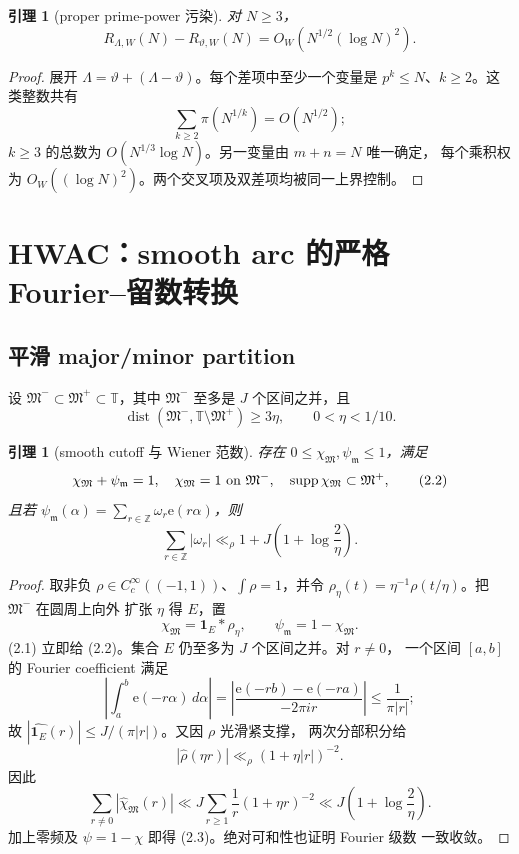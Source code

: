 \documentclass[11pt,a4paper]{ctexart}
\newtheorem{lemma}[theorem]{引理}
\theoremstyle{definition}
\newcommand{\T}{\mathbb T}
\newcommand{\e}{\mathrm e}
\newcommand{\1}{\mathbf 1}
\begin{document}
\begin{lemma}[proper prime-power 污染]
对 $N\ge3$，
\[
R_{\Lambda,W}(N)-R_{\vartheta,W}(N)
=O_W\!\left(N^{1/2}(\log N)^2\right).                  \tag{1.5}
\]
\end{lemma}

\begin{proof}
展开 $\Lambda=\vartheta+(\Lambda-\vartheta)$。每个差项中至少一个变量是
$p^k\le N$、$k\ge2$。这类整数共有
\[
\sum_{k\ge2}\pi(N^{1/k})=O(N^{1/2});
\]
$k\ge3$ 的总数为 $O(N^{1/3}\log N)$。另一变量由 $m+n=N$ 唯一确定，
每个乘积权为 $O_W((\log N)^2)$。两个交叉项及双差项均被同一上界控制。
\end{proof}

\section{HWAC：smooth arc 的严格 Fourier--留数转换}

\subsection{平滑 major/minor partition}

设 $\mathfrak M^-\subset\mathfrak M^+\subset\T$，其中 $\mathfrak M^-$
至多是 $J$ 个区间之并，且
\[
\operatorname{dist}(\mathfrak M^-,\T\setminus\mathfrak M^+)\ge3\eta,
\qquad 0<\eta<1/10.                                    \tag{2.1}
\]

\begin{lemma}[smooth cutoff 与 Wiener 范数]
存在 $0\le\chi_{\mathfrak M},\psi_{\mathfrak m}\le1$，满足
\[
\chi_{\mathfrak M}+\psi_{\mathfrak m}=1,\quad
\chi_{\mathfrak M}=1\ \hbox{on }\mathfrak M^-,\quad
\operatorname{supp}\chi_{\mathfrak M}\subset\mathfrak M^+,             \tag{2.2}
\]
且若
\(
\psi_{\mathfrak m}(\alpha)=\sum_{r\in\mathbb Z}\omega_r\e(r\alpha)
\)，则
\[
\sum_{r\in\mathbb Z}|\omega_r|
\ll_\rho 1+J\left(1+\log\frac2\eta\right).             \tag{2.3}
\]
\end{lemma}

\begin{proof}
取非负 $\rho\in C_c^\infty((-1,1))$、$\int\rho=1$，并令
$\rho_\eta(t)=\eta^{-1}\rho(t/\eta)$。把 $\mathfrak M^-$ 在圆周上向外
扩张 $\eta$ 得 $E$，置
\[
\chi_{\mathfrak M}=\1_E*\rho_\eta,\qquad
\psi_{\mathfrak m}=1-\chi_{\mathfrak M}.               \tag{2.4}
\]
(2.1) 立即给 (2.2)。集合 $E$ 仍至多为 $J$ 个区间之并。对 $r\ne0$，
一个区间 $[a,b]$ 的 Fourier coefficient 满足
\[
\left|\int_a^b\e(-r\alpha)\,d\alpha\right|
=\left|\frac{\e(-rb)-\e(-ra)}{-2\pi ir}\right|
\le\frac1{\pi|r|};                                    \tag{2.5}
\]
故 $|\widehat{\1_E}(r)|\le J/(\pi|r|)$。又因 $\rho$ 光滑紧支撑，
两次分部积分给
\[
|\widehat\rho(\eta r)|\ll_\rho(1+\eta|r|)^{-2}.       \tag{2.6}
\]
因此
\[
\sum_{r\ne0}|\widehat\chi_{\mathfrak M}(r)|
\ll J\sum_{r\ge1}\frac1r(1+\eta r)^{-2}
\ll J\left(1+\log\frac2\eta\right).                  \tag{2.7}
\]
加上零频及 $\psi=1-\chi$ 即得 (2.3)。绝对可和性也证明 Fourier 级数
一致收敛。
\end{proof}
\end{document}
